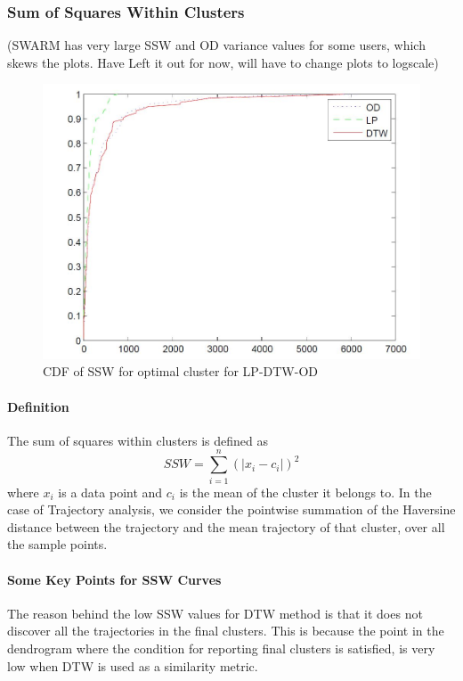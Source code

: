 \subsubsection{Sum of Squares Within Clusters}

(SWARM has very large SSW and OD variance values for some users, which skews the plots. Have Left it out for now, will have to change plots to logscale) 

\begin{figure}[H]
\centering     
\includegraphics[scale=0.3]{figs/ssw_cdf.jpg}
\caption{CDF of SSW for optimal cluster for LP-DTW-OD}
\label{fig:ssw_cdf}  
\end{figure} 

\paragraph{Definition}
The sum of squares within clusters is defined as
\begin{equation}
SSW=\sum _{i=1}^{n}(\left |x_i-c_i  \right |)^2
\end{equation}
where $x_i$ is a data point and $c_i$ is the mean of the cluster it belongs to. In the case of Trajectory analysis, we consider the pointwise summation of the Haversine distance between the trajectory and the mean trajectory of that cluster, over all the sample points. 

\paragraph{Some Key Points for SSW Curves}
The reason behind the low SSW values for DTW method is that it does not discover all the trajectories in the final clusters. This is because the point in the dendrogram where the condition for reporting final clusters is satisfied, is very low when DTW is used as a similarity metric. 


